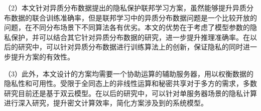 （2）本文针对异质分布数据提出的隐私保护联邦学习方案，虽然能够提升异质分布数据的联合训练准确率，但是联邦学习中的异质分布数据问题是一个比较开放的问题，在不同分布场景下不同算法各有优劣。本文的优势在于考虑了模型参数的隐私保护，并可以结合其它针对异质分布数据的研究，进一步提升推理准确率。在以后的研究中，可以针对异质分布数据进行训练算法上的创新，保证隐私的同时进一步提升方案的有效性。

（3）此外，本文设计的方案均需要一个协助运算的辅助服务器，用以权衡数据的隐私性和可用性。受限于全同态上的非线性运算和秘密共享对于多方的需求，多数研究目前还是基于双云模型。在以后的研究中，可以针对单服务器场景的隐私计算进行深入研究，提升密文计算效率，简化方案涉及到的系统模型。

